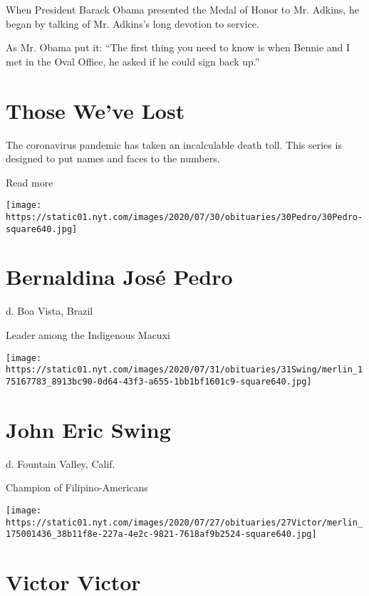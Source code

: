 When President Barack Obama presented the Medal of Honor to Mr. Adkins,
he began by talking of Mr. Adkins's long devotion to service.

As Mr. Obama put it: ``The first thing you need to know is when Bennie
and I met in the Oval Office, he asked if he could sign back up.''

\href{https://www.nytimes.com/interactive/2020/obituaries/people-died-coronavirus-obituaries.html?action=click\&pgtype=Article\&state=default\&region=BELOW_MAIN_CONTENT\&context=covid_obits_promo}{}

\hypertarget{those-weve-lost}{%
\section{Those We've Lost}\label{those-weve-lost}}

The coronavirus pandemic has taken an incalculable death toll. This
series is designed to put names and faces to the numbers.

Read more

\texttt{[image: https://static01.nyt.com/images/2020/07/30/obituaries/30Pedro/30Pedro-square640.jpg]}

\hypertarget{bernaldina-josuxe9-pedro}{%
\section{Bernaldina José Pedro}\label{bernaldina-josuxe9-pedro}}

d. Boa Vista, Brazil

Leader among the Indigenous Macuxi

\texttt{[image: https://static01.nyt.com/images/2020/07/31/obituaries/31Swing/merlin\_175167783\_8913bc90-0d64-43f3-a655-1bb1bf1601c9-square640.jpg]}

\hypertarget{john-eric-swing}{%
\section{John Eric Swing}\label{john-eric-swing}}

d. Fountain Valley, Calif.

Champion of Filipino-Americans

\texttt{[image: https://static01.nyt.com/images/2020/07/27/obituaries/27Victor/merlin\_175001436\_38b11f8e-227a-4e2c-9821-7618af9b2524-square640.jpg]}

\hypertarget{victor-victor}{%
\section{Victor Victor}\label{victor-victor}}

